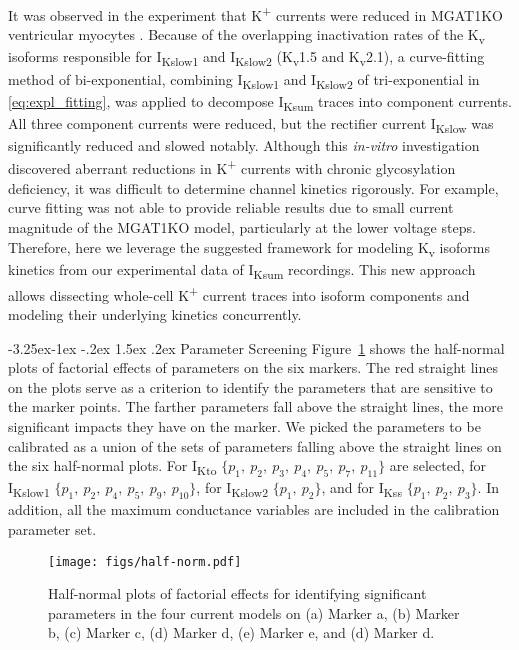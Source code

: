 \documentclass[11pt]{article}
\makeatletter
\renewcommand\subsection{\@startsection{subsection}{2}{\z@}%
                                     {-3.25ex\@plus -1ex \@minus -.2ex}%
                                     {1.5ex \@plus .2ex}%
                                     {\normalfont\fontfamily{phv}\fontsize{14}{17}\bfseries}}
\makeatother
\begin{document}
It was observed in the experiment that K\textsuperscript{+} currents were reduced in MGAT1KO ventricular myocytes \citep{ednie2019reduced}. Because of the overlapping inactivation rates of the K\textsubscript{v} isoforms responsible for I\textsubscript{Kslow1} and I\textsubscript{Kslow2} (K\textsubscript{v}1.5 and K\textsubscript{v}2.1), a curve-fitting method of bi-exponential, combining I\textsubscript{Kslow1} and I\textsubscript{Kslow2} of tri-exponential in \eqref{eq:expl_fitting}, was applied to decompose I\textsubscript{Ksum} traces into component currents. All three component currents were reduced, but the rectifier current I\textsubscript{Kslow} was significantly reduced and slowed notably. Although this \textit{in-vitro} investigation discovered aberrant reductions in K\textsuperscript{+} currents with chronic glycosylation deficiency, it was difficult to determine channel kinetics rigorously. For example, curve fitting was not able to provide reliable results due to small current magnitude of the MGAT1KO model, particularly at the lower voltage steps. Therefore, here we leverage the suggested framework for modeling K\textsubscript{v} isoforms kinetics from our experimental data of I\textsubscript{Ksum} recordings. This new approach allows dissecting whole-cell K\textsuperscript{+} current traces into isoform components and modeling their underlying kinetics concurrently.

\subsection{Parameter Screening}
Figure~\ref{fig:half-norm} shows the half-normal plots of factorial effects of parameters on the six markers. The red straight lines on the plots serve as a criterion to identify the parameters that are sensitive to the marker points. The farther parameters fall above the straight lines, the more significant impacts they have on the marker. We picked the parameters to be calibrated as a union of the sets of parameters falling above the straight lines on the six half-normal plots. For I\textsubscript{Kto} $\{p_{1},\ p_{2},\ p_{3},\ p_{4},\ p_{5},\ p_{7},\ p_{11}\}$ are selected, for I\textsubscript{Kslow1} $\{p_{1},\ p_{2},\ p_{4},\ p_{5},\ p_{9},\ p_{10}\}$, for I\textsubscript{Kslow2} $\{p_{1},\ p_{2}\}$, and for I\textsubscript{Kss} $\{p_{1},\ p_{2},\ p_{3}\}$. In addition, all the maximum conductance variables are included in the calibration parameter set. 
\begin{figure}
    \centering
    \texttt{[image: figs/half-norm.pdf]}
    \caption{Half-normal plots of factorial effects for identifying significant parameters in the four current models on (a) Marker a, (b) Marker b, (c) Marker c, (d) Marker d, (e) Marker e, and (d) Marker d.}
    \label{fig:half-norm}
\end{figure}
\end{document}
